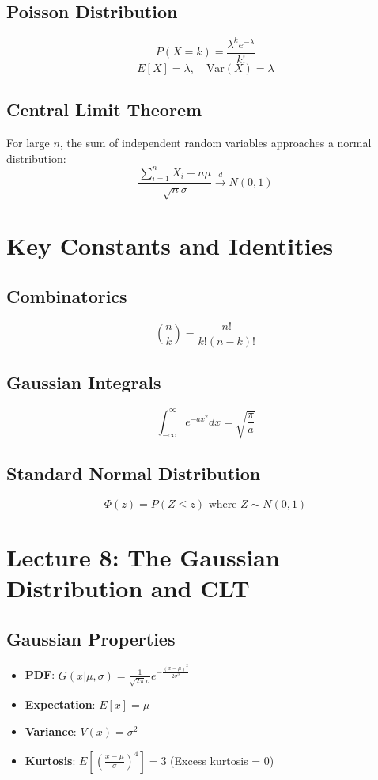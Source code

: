 \documentclass[10pt, twocolumn]{article}
\begin{document}
\subsection{Poisson Distribution}
\[ P(X = k) = \frac{\lambda^k e^{-\lambda}}{k!} \]
\[ E[X] = \lambda, \quad \text{Var}(X) = \lambda \]

\subsection{Central Limit Theorem}
For large $n$, the sum of independent random variables approaches a normal distribution:
\[ \frac{\sum_{i=1}^n X_i - n\mu}{\sqrt{n}\sigma} \xrightarrow{d} N(0,1) \]

\section{Key Constants and Identities}

\subsection{Combinatorics}
\[ \binom{n}{k} = \frac{n!}{k!(n-k)!} \]

\subsection{Gaussian Integrals}
\[ \int_{-\infty}^{\infty} e^{-ax^2} dx = \sqrt{\frac{\pi}{a}} \]

\subsection{Standard Normal Distribution}
\[ \Phi(z) = P(Z \leq z) \text{ where } Z \sim N(0,1) \]


\section{Lecture 8: The Gaussian Distribution and CLT}

\subsection{Gaussian Properties}
\begin{itemize}
    \item \textbf{PDF}: $G(x|\mu, \sigma) = \frac{1}{\sqrt{2 \pi} \sigma} e^{-\frac{(x - \mu)^2}{2 \sigma^2}}$
    \item \textbf{Expectation}: $E[x] = \mu$
    \item \textbf{Variance}: $V(x) = \sigma^2$
    \item \textbf{Kurtosis}: $E\left[\left(\frac{x-\mu}{\sigma}\right)^4\right] = 3$ (Excess kurtosis = 0)
\end{itemize}
\end{document}

